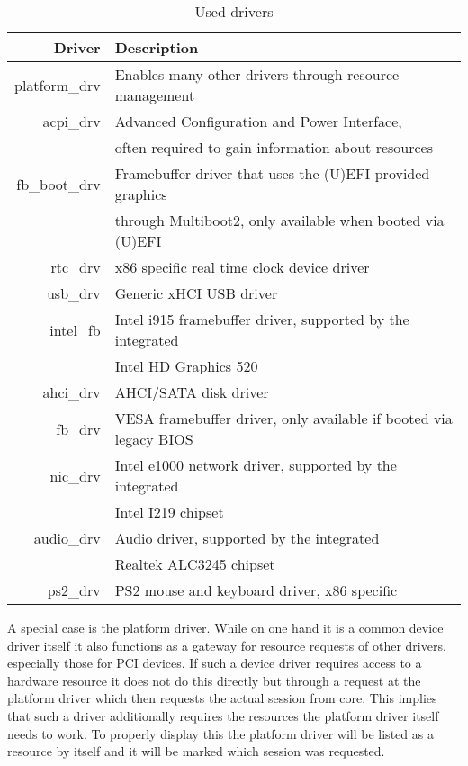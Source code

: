 \documentclass[
a4paper,
12pt,
notitlepage,
parskip=half,
DIV=11,
]{scrbook}
\begin{document}
		\begin{table}[]
			\centering
			\begin{tabular}{r|l}
				Driver        & 
				Description 
				\\ \hline
				platform\_drv & 
				Enables many other drivers through resource management
				\\ \hline
				acpi\_drv     &
				Advanced Configuration and Power Interface,
				\\& often required to gain information about resources \citep{acpi_spec}
				\\ \hline
				fb\_boot\_drv &
				Framebuffer driver that uses the (U)EFI provided graphics
				\\& through Multiboot2, only available when booted via (U)EFI  \citep{multiboot2}
				\\ \hline
				rtc\_drv      &
				x86 specific real time clock device driver
				\\ \hline
				usb\_drv      &
				Generic xHCI USB driver \citep{xhci}
				\\ \hline
				intel\_fb     &
				Intel i915 framebuffer driver, supported by the integrated
				\\& Intel HD Graphics 520 \citep{x260}
				\\ \hline
				ahci\_drv     &
				AHCI/SATA disk driver
				\\ \hline
				fb\_drv       &
				VESA framebuffer driver, only available if booted via legacy BIOS
				\\ \hline
				nic\_drv      &
				Intel e1000 network driver, supported by the integrated
				\\& Intel I219 chipset \citep{x260}
				\\  \hline
				audio\_drv    &
				Audio driver, supported by the integrated
				\\& Realtek ALC3245 chipset \citep{x260}
				\\  \hline
				ps2\_drv      &
				PS2 mouse and keyboard driver, x86 specific
			\end{tabular}
			\caption{Used drivers}
			\label{driver_selection}
		\end{table}
		
		A special case is the platform driver.
		While on one hand it is a common device driver itself it also functions as a gateway for resource requests of other drivers, especially those for PCI devices.
		If such a device driver requires access to a hardware resource it does not do this directly but through a request at the platform driver which then requests the actual session from core.
		This implies that such a driver additionally requires the resources the platform driver itself needs to work.
		To properly display this the platform driver will be listed as a resource by itself and it will be marked which session was requested.
		
\end{document}

